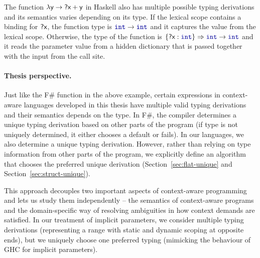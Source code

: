 %
The function $\lambda\ident{y}\rightarrow\ident{?x}+\ident{y}$ in Haskell also has multiple
possible typing derivations and its semantics varies depending on its type. If the lexical
scope contains a binding for $\textnormal{\sffamily ?x}$, the function type is $\kvd{int}\rightarrow\kvd{int}$
and it captures the value from the lexical scope. Otherwise, the type of the function is
$\{\ident{?x}:\kvd{int}\}\Rightarrow\kvd{int}\rightarrow\kvd{int}$ and it reads the parameter
value from a hidden dictionary that is passed together with the input from the call site.

\paragraph{Thesis perspective.}
Just like the F\# function in the above example, certain expressions in context-aware languages
developed in this thesis have multiple valid typing derivations and their semantics depends on the
type. In F\#, the compiler determines a unique typing derivation based on other parts of the program
(if type is not uniquely determined, it either chooses a default or fails). In our languages, we
also determine a unique typing derivation. However, rather than relying on type information from
other parts of the program, we explicitly define an algorithm that chooses the preferred unique
derivation (Section~\ref{sec:flat-unique} and Section~\ref{sec:struct-unique}).

This approach decouples two important aspects of context-aware programming and lets us study them
independently -- the semantics of context-aware programs and the domain-specific way of resolving
ambiguities in how context demands are satisfied. In our treatment of implicit parameters, we consider
multiple typing derivations (representing a range with static and dynamic scoping at opposite ends),
but we uniquely choose one preferred typing (mimicking the behaviour of GHC for implicit parameters).



%
%

